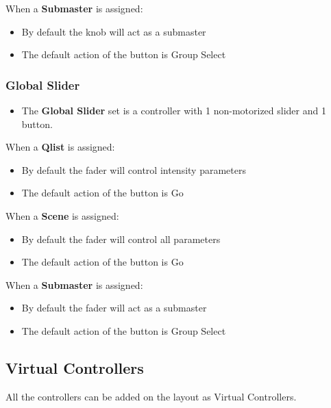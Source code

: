 \documentclass[
]{article}
\providecommand{\tightlist}{%
  \setlength{\itemsep}{0pt}\setlength{\parskip}{0pt}}
\begin{document}
When a \textbf{Submaster} is assigned:

\begin{itemize}
\item
  By default the knob will act as a submaster
\item
  The default action of the button is Group Select
\end{itemize}

\hypertarget{global-slider}{%
\subsubsection{Global Slider}\label{global-slider}}

\begin{itemize}
\tightlist
\item
  The \textbf{Global Slider} set is a controller with 1 non-motorized slider and 1 button.
\end{itemize}

When a \textbf{Qlist} is assigned:

\begin{itemize}
\item
  By default the fader will control intensity parameters
\item
  The default action of the button is Go
\end{itemize}

When a \textbf{Scene} is assigned:

\begin{itemize}
\item
  By default the fader will control all parameters
\item
  The default action of the button is Go
\end{itemize}

When a \textbf{Submaster} is assigned:

\begin{itemize}
\item
  By default the fader will act as a submaster
\item
  The default action of the button is Group Select
\end{itemize}

\hypertarget{Virtual-Controllers-11.2}{%
\subsection{Virtual Controllers}\label{Virtual-Controllers-11.2}}

All the controllers can be added on the layout as Virtual Controllers.
\end{document}
